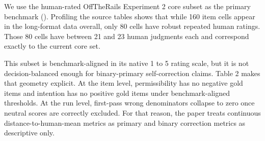 \documentclass[
]{article}
\begin{document}
We use the human-rated OffTheRails Experiment 2 core subset as the
primary benchmark (). Profiling the source tables shows that while 160 item cells
appear in the long-format data overall, only 80 cells have robust
repeated human ratings. Those 80 cells have between 21 and 23 human
judgments each and correspond exactly to the current core set.

This subset is benchmark-aligned in its native 1 to 5 rating scale, but
it is not decision-balanced enough for binary-primary self-correction
claims. Table 2 makes that geometry explicit. At the item level,
permissibility has no negative gold items and intention has no positive
gold items under benchmark-aligned thresholds. At the run level,
first-pass wrong denominators collapse to zero once neutral scores are
correctly excluded. For that reason, the paper treats continuous
distance-to-human-mean metrics as primary and binary correction metrics
as descriptive only.
\end{document}
